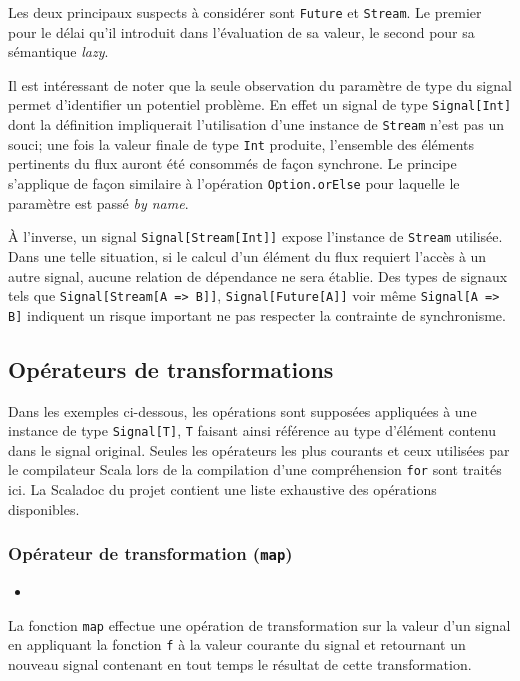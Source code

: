 Les deux principaux suspects à considérer sont \texttt{Future} et \texttt{Stream}. Le premier pour le délai qu'il introduit dans l'évaluation de sa valeur, le second pour sa sémantique \emph{lazy}.

Il est intéressant de noter que la seule observation du paramètre de type du signal permet d'identifier un potentiel problème. En effet un signal de type \texttt{Signal[Int]} dont la définition impliquerait l'utilisation d'une instance de \texttt{Stream} n'est pas un souci; une fois la valeur finale de type \texttt{Int} produite, l'ensemble des éléments pertinents du flux auront été consommés de façon synchrone. Le principe s'applique de façon similaire à l'opération \texttt{Option.orElse} pour laquelle le paramètre est passé \emph{by name}.

À l'inverse, un signal \texttt{Signal[Stream[Int]]} expose l'instance de \texttt{Stream} utilisée. Dans une telle situation, si le calcul d'un élément du flux requiert l'accès à un autre signal, aucune relation de dépendance ne sera établie. Des types de signaux tels que \texttt{Signal[Stream[A => B]]}, \texttt{Signal[Future[A]]} voir même \texttt{Signal[A => B]} indiquent un risque important ne pas respecter la contrainte de synchronisme.

\subsection{Opérateurs de transformations}
Dans les exemples ci-dessous, les opérations sont supposées appliquées à une instance de type \texttt{Signal[T]}, \texttt{T} faisant ainsi référence au type d'élément contenu dans le signal original. Seules les opérateurs les plus courants et ceux utilisées par le compilateur Scala lors de la compilation d'une compréhension \texttt{for} sont traités ici. La Scaladoc du projet contient une liste exhaustive des opérations disponibles.

\subsubsection{Opérateur de transformation (\texttt{map})}

\begin{itemize}
	\item {}
\end{itemize}

La fonction \texttt{map} effectue une opération de transformation sur la valeur d'un signal en appliquant la fonction \texttt{f} à la valeur courante du signal et retournant un nouveau signal contenant en tout temps le résultat de cette transformation.

